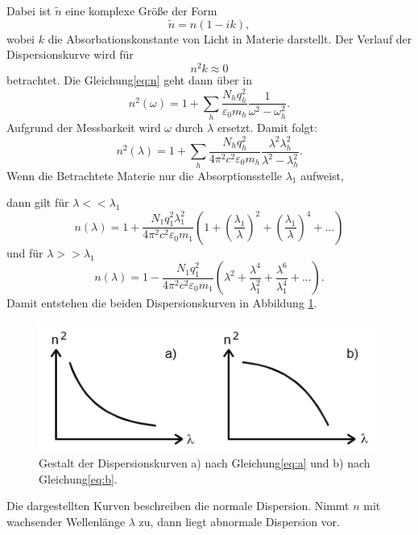 Dabei ist $\tilde{n}$ eine komplexe Größe der Form
\begin{equation}
  \tilde{n} = n(1 - ik) ,
\end{equation}
wobei $k$ die Absorbationskonstante von Licht in Materie darstellt.
Der Verlauf der Dispersionskurve wird für
\begin{equation}
  n^2 k \approx 0
\end{equation}
betrachtet.
Die Gleichung\eqref{eq:n} geht dann über in
\begin{equation}
  n^2 (\omega) = 1 + \sum_{h} \frac{N_h q_h ^2}{\varepsilon_0 m_h}\frac {1}{\omega ^2 -\omega_h ^2} .
\end{equation}
Aufgrund der Messbarkeit wird $\omega$ durch $\lambda$ ersetzt.
Damit folgt:
\begin{equation}
  n^2 (\lambda) = 1 + \sum_{h} \frac{N_h q_h ^2}{4 \pi^2 c^2 \varepsilon_0 m_h}\frac{\lambda^2\lambda_h ^2}{\lambda^2 - \lambda_h ^2} .
\end{equation}
Wenn die Betrachtete Materie nur die Absorptionsstelle $\lambda_1$ aufweist,

\noindent dann gilt für $\lambda << \lambda_1$
\begin{equation}
  \label{eq:a}
  n(\lambda) = 1 + \frac{N_1 q_1 ^2 \lambda_1 ^2}{4 \pi^2 c^2 \varepsilon_0 m_1}(1 + (\frac{\lambda_1}{\lambda})^2 + (\frac{\lambda_1}{\lambda})^4 + ...)
\end{equation}
und für $\lambda >> \lambda_1$
\begin{equation}
  \label{eq:b}
  n(\lambda) = 1 - \frac{N_1 q_1 ^2 }{4 \pi^2 c^2 \varepsilon_0 m_1}(\lambda^2+ \frac{\lambda^4}{\lambda_1 ^2} + \frac{\lambda^6}{\lambda_1 ^4} + ...)  .
\end{equation}
Damit entstehen die beiden Dispersionskurven in Abbildung \ref{fig:disp}.
\begin{figure}[H]
  \centering
  \includegraphics[scale=0.6]{content/disp.png}
  \caption{Gestalt der Dispersionskurven a) nach Gleichung\eqref{eq:a} und b) nach Gleichung\eqref{eq:b}\cite{v402}.}
  \label{fig:disp}
\end{figure}
\noindent Die dargestellten Kurven beschreiben die normale Dispersion.
Nimmt $n$ mit wachsender Wellenlänge $\lambda$ zu, dann liegt abnormale Dispersion vor.
